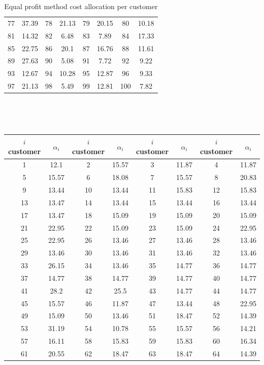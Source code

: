 \begin{table}[H]
\begin{tabular}{c| c |c |c |c|c|c|c}
		77 & 37.39 & 78 & 21.13 & 79 & 20.15 & 80 & 10.18 \\
		81 & 14.32 & 82 & 6.48 & 83 & 7.89 & 84 & 17.33 \\
		85 & 22.75 & 86 & 20.1 & 87 & 16.76 & 88 & 11.61 \\
		89 & 27.63 & 90 & 5.08 & 91 & 7.72 & 92 & 9.22 \\
		93 & 12.67 & 94 & 10.28 & 95 & 12.87 & 96 & 9.33 \\
		97 & 21.13 & 98 & 5.49 & 99 & 12.81 & 100 & 7.82 \\
		\hline 
	\end{tabular} \
	\caption{Equal profit method cost allocation per customer}
	\label{EPM}
\end{table}\

\begin{table}[H]
	\centering
	\begin{tabular}{c| c |c |c |c|c|c|c}
		\hline 
		$i$ customer & $\alpha_i$ & $i$ customer & $\alpha_i$ & $i$ customer & $\alpha_i$& $i$ customer & $\alpha_i$\\
		\hline
		1 & 12.1 & 2 & 15.57 & 3 & 11.87 & 4 & 11.87 \\
		5 & 15.57 & 6 & 18.08 & 7 & 15.57 & 8 & 20.83 \\
		9 & 13.44 & 10 & 13.44 & 11 & 15.83 & 12 & 15.83 \\
		13 & 13.47 & 14 & 13.44 & 15 & 13.44 & 16 & 13.44 \\
		17 & 13.47 & 18 & 15.09 & 19 & 15.09 & 20 & 15.09 \\
		21 & 22.95 & 22 & 15.09 & 23 & 15.09 & 24 & 22.95 \\
		25 & 22.95 & 26 & 13.46 & 27 & 13.46 & 28 & 13.46 \\
		29 & 13.46 & 30 & 13.46 & 31 & 13.46 & 32 & 13.46 \\
		33 & 26.15 & 34 & 13.46 & 35 & 14.77 & 36 & 14.77 \\
		37 & 14.77 & 38 & 14.77 & 39 & 14.77 & 40 & 14.77 \\
		41 & 28.2 & 42 & 25.5 & 43 & 14.77 & 44 & 14.77 \\
		45 & 15.57 & 46 & 11.87 & 47 & 13.44 & 48 & 22.95 \\
		49 & 15.09 & 50 & 13.46 & 51 & 18.47 & 52 & 14.39 \\
		53 & 31.19 & 54 & 10.78 & 55 & 15.57 & 56 & 14.21 \\
		57 & 16.11 & 58 & 15.83 & 59 & 15.83 & 60 & 16.34 \\
		61 & 20.55 & 62 & 18.47 & 63 & 18.47 & 64 & 14.39 \\

\end{tabular}
\end{table}
